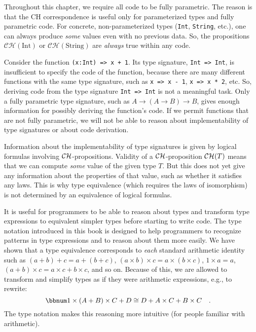 Throughout this chapter, we require all code to be fully parametric.
The reason is that the CH correspondence is useful only for parameterized
types and fully parametric code. For concrete, non-parameterized types
(\lstinline!Int!, \lstinline!String!, etc.), one can always produce
\emph{some} values even with no previous data. So, the propositions
$\mathcal{CH}(\text{Int})$ or $\mathcal{CH}(\text{String})$ are
\emph{always} true within any code.

Consider the function \lstinline!(x:Int) => x + 1!. Its type signature,
\lstinline!Int => Int!, is insufficient to specify the code of the
function, because there are many different functions with the same
type signature, such as \lstinline!x => x - 1!, \lstinline!x => x * 2!,
etc. So, deriving code from the type signature \lstinline!Int => Int!
is not a meaningful task. Only a fully parametric type signature,
such as $A\rightarrow\left(A\rightarrow B\right)\rightarrow B$, gives
enough information for possibly deriving the function\textsf{'}s code. If we
permit functions that are not fully parametric, we will not be able
to reason about implementability of type signatures or about code
derivation.

Information about the implementability of type signatures is given
by logical formulas involving ${\cal CH}$-propositions. Validity
of a ${\cal CH}$-proposition ${\cal CH}(T)$ means that we can compute
\emph{some} value of the given type $T$. But this does not yet give
any information about the properties of that value, such as whether
it satisfies any laws. This is why type equivalence (which requires
the laws of isomorphism) is not determined by an equivalence of logical
formulas.

It is useful for programmers to be able to reason about types and
transform type expressions to equivalent simpler types before starting
to write code. The type notation introduced in this book is designed
to help programmers to recognize patterns in type expressions and
to reason about them more easily. We have shown that a type equivalence
corresponds to \emph{each} standard arithmetic identity such as $\left(a+b\right)+c=a+\left(b+c\right)$,
$\left(a\times b\right)\times c=a\times(b\times c)$, $1\times a=a$,
$\left(a+b\right)\times c=a\times c+b\times c$, and so on. Because
of this, we are allowed to transform and simplify types as if they
were arithmetic expressions, e.g., to rewrite:
\[
\bbnum 1\times\left(A+B\right)\times C+D\cong D+A\times C+B\times C\quad.
\]
The type notation makes this reasoning more intuitive (for people
familiar with arithmetic). 

